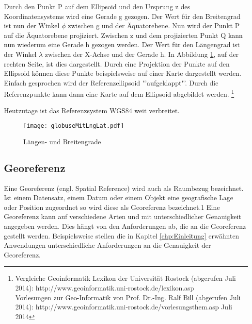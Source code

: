 			Durch den Punkt P auf dem Ellipsoid und den Ursprung z des Koordinatensystems wird eine Gerade g gezogen. 
			Der Wert für den Breitengrad ist nun der Winkel $\phi$ zwischen g und der Äquatorebene.
			Nun wird der Punkt P auf die Äquatorebene projiziert.
			Zwischen z und dem projizierten Punkt Q kann nun wiederum eine Gerade h gezogen werden.
			Der Wert für den Längengrad ist der Winkel $\lambda$ zwischen der X-Achse und der Gerade h. 
			In Abbildung \ref{img:lnglat}, auf der rechten Seite, ist dies dargestellt.
			Durch eine Projektion der Punkte auf den Ellipsoid können diese Punkte beispielsweise auf einer Karte dargestellt werden.
			Einfach gesprochen wird der Referenzellipsoid "'aufgeklappt"'. 
			Durch die Referenzpunkte kann dann eine Karte auf dem Ellipsoid abgebildet werden.
			\footnote{Vergleiche Geoinformatik Lexikon der Universität Rostock (abgerufen Juli 2014): http://www.geoinformatik.uni-rostock.de/lexikon.asp \\ Vorlesungen zur Geo-Informatik von Prof. Dr.-Ing. Ralf Bill (abgerufen Juli 2014): http://www.geoinformatik.uni-rostock.de/vorlesungsthem.asp \label{ft:geoinfolex}  Juli 2014}

			Heutzutage ist das Referenzsystem WGS84 weit verbreitet.

			\begin{figure}[h!]
			\begin{center}
				\texttt{[image: globuseMitLngLat.pdf]}
				\caption{Längen- und Breitengrade}
				\label{img:lnglat}
			\end{center}
			\end{figure}	

		\subsection{Georeferenz} 
			
			Eine Georeferenz (engl. Spatial Reference) wird auch als Raumbezug bezeichnet. 
			Ist einem Datensatz, einem Datum oder einem Objekt eine geografische Lage oder Position zugeordnet so wird diese als Georeferenz bezeichnet.1 
			Eine Georeferenz kann auf verschiedene Arten und mit unterschiedlicher Genauigkeit angegeben werden.
			Dies hängt von den Anforderungen ab, die an die Georeferenz gestellt werden. 
			Beispielsweise stellen die in Kapitel \ref{chp:Einleitung} erwähnten Anwendungen unterschiedliche Anforderungen an die Genauigkeit der Georeferenz.  
			
